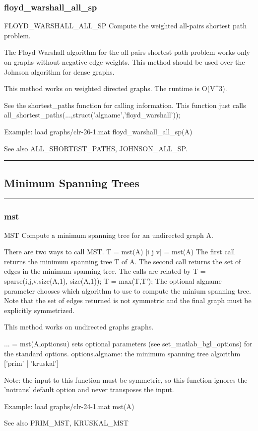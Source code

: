 \subsubsection*{floyd\_warshall\_all\_sp}
\begin{mcode}
  FLOYD_WARSHALL_ALL_SP Compute the weighted all-pairs shortest path problem.
 
  The Floyd-Warshall algorithm for the all-pairs shortest path problem 
  works only on graphs without negative edge weights.  This method should
  be used over the Johnson algorithm for dense graphs.  
 
  This method works on weighted directed graphs.
  The runtime is O(V^3).
 
  See the shortest_paths function for calling information.  This function 
  just calls all_shortest_paths(...,struct('algname','floyd_warshall'));
 
  Example:
     load graphs/clr-26-1.mat
     floyd_warshall_all_sp(A)
 
  See also ALL_SHORTEST_PATHS, JOHNSON_ALL_SP.
\end{mcode}
\newpage
\hrule
\subsection*{Minimum Spanning Trees}
\vspace{1cm}
\hrule
\subsubsection*{mst}
\begin{mcode}
  MST Compute a minimum spanning tree for an undirected graph A.
 
  There are two ways to call MST.
  T = mst(A)
  [i j v] = mst(A) 
  The first call returns the minimum spanning tree T of A.  
  The second call returns the set of edges in the minimum spanning tree.  
  The calls are related by 
     T = sparse(i,j,v,size(A,1), size(A,1)); 
     T = max(T,T');
  The optional algname parameter chooses which algorithm to use to compute
  the minium spanning tree.  Note that the set of edges returned is not
  symmetric and the final graph must be explicitly symmetrized.
 
  This method works on undirected graphs graphs.
 
  ... = mst(A,optionsu) sets optional parameters (see 
  set_matlab_bgl_options) for the standard options.
    options.algname: the minimum spanning tree algorithm
      [{'prim'} | 'kruskal']
 
  Note: the input to this function must be symmetric, so this function
  ignores the 'notrans' default option and never transposes the input.
 
  Example:
     load graphs/clr-24-1.mat
     mst(A)
 
  See also PRIM_MST, KRUSKAL_MST
\end{mcode}
\newpage

